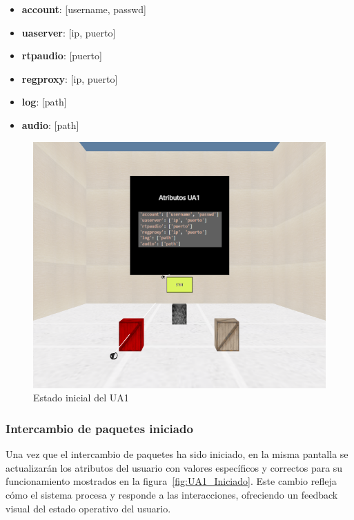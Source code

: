 \documentclass[a4paper, 12pt]{book}
\begin{document}
\begin{itemize}
  \item \textbf{account}: [username, passwd]
  \item \textbf{uaserver}: [ip, puerto]
  \item \textbf{rtpaudio}: [puerto]
  \item \textbf{regproxy}: [ip, puerto]
  \item \textbf{log}: [path]
  \item \textbf{audio}: [path]
\end{itemize}

\begin{figure}
  \centering
  \includegraphics[width=15cm, keepaspectratio]{img/resultados/UA1_NoIniciado.png}
  \caption{Estado inicial del UA1}
  \label{fig:UA1_NoIniciado}
\end{figure}


\subsubsection{Intercambio de paquetes iniciado}
\label{subsubsec:Intercambio_Iniciado}
Una vez que el intercambio de paquetes ha sido iniciado, en la misma pantalla se 
actualizarán los atributos del usuario con valores específicos y correctos para su funcionamiento mostrados en la figura~\ref{fig:UA1_Iniciado}.  
Este cambio refleja cómo el sistema procesa y responde a las interacciones, ofreciendo un feedback visual del estado operativo del usuario.
\end{document}
